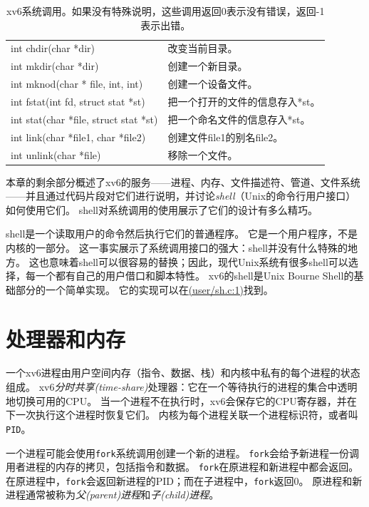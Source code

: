 \begin{table}[htbp]
\begin{tabular}{ll}
        int chdir(char *dir)  & 改变当前目录。  \\
        int mkdir(char *dir)  & 创建一个新目录。    \\
        int mknod(char * file, int, int)   & 创建一个设备文件。  \\
        int fstat(int fd, struct stat *st)       & 把一个打开的文件的信息存入*st。  \\
        int stat(char *file, struct stat *st) &  把一个命名文件的信息存入*st。\\
        int link(char *file1, char *file2)    & 创建文件file1的别名file2。    \\
        int unlink(char *file)& 移除一个文件。 \\
    \end{tabular}
    \caption{xv6系统调用。如果没有特殊说明，这些调用返回0表示没有错误，返回-1表示出错。}
    \label{t1-1}
\end{table}

本章的剩余部分概述了xv6的服务——进程、内存、文件描述符、管道、文件系统——并且通过代码片段对它们进行说明，并讨论\emph{shell}（Unix的命令行用户接口）如何使用它们。
shell对系统调用的使用展示了它们的设计有多么精巧。

shell是一个读取用户的命令然后执行它们的普通程序。
它是一个用户程序，不是内核的一部分。
这一事实展示了系统调用接口的强大：shell并没有什么特殊的地方。
这也意味着shell可以很容易的替换；因此，现代Unix系统有很多shell可以选择，每一个都有自己的用户借口和脚本特性。
xv6的shell是Unix Bourne Shell的基础部分的一个简单实现。
它的实现可以在\href{https://github.com/mit-pdos/xv6-riscv/blob/riscv/user/sh.c#L1}{(user/sh.c:1)}找到。

\section{处理器和内存}

一个xv6进程由用户空间内存（指令、数据、栈）和内核中私有的每个进程的状态组成。
xv6\emph{分时共享(time-share)}处理器：它在一个等待执行的进程的集合中透明地切换可用的CPU。
当一个进程不在执行时，xv6会保存它的CPU寄存器，并在下一次执行这个进程时恢复它们。
内核为每个进程关联一个进程标识符，或者叫\texttt{PID}。

一个进程可能会使用\texttt{fork}系统调用创建一个新的进程。
\texttt{fork}会给予新进程一份调用者进程的内存的拷贝，包括指令和数据。
\texttt{fork}在原进程和新进程中都会返回。
在原进程中，\texttt{fork}会返回新进程的PID；而在子进程中，\texttt{fork}返回0。
原进程和新进程通常被称为\emph{父(parent)进程}和\emph{子(child)进程}。

